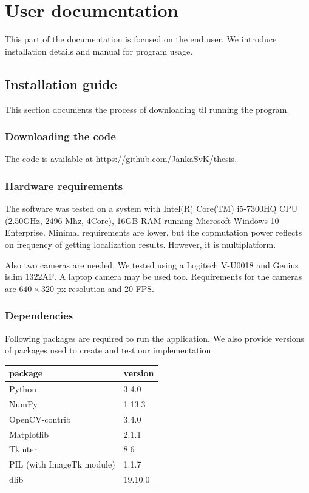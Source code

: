 \chapter{User documentation}
This part of the documentation is focused on the end user. We introduce
installation details and manual for program usage.

\section{Installation guide}
This section documents the process of downloading til running the program.

\subsection{Downloading the code}
The code is available at \url{https://github.com/JankaSvK/thesis}.

\subsection{Hardware requirements}
The software was tested on a system with Intel(R) Core(TM) i5-7300HQ CPU
(2.50GHz, 2496 Mhz, 4Core), 16GB RAM running Microsoft Windows 10 Enterprise.
Minimal requirements are lower, but the copmutation power reflects on frequency
of getting localization results. However, it is multiplatform.

Also two cameras are needed. We tested using a Logitech V-U0018 and Genius
islim 1322AF. A laptop camera may be used too. Requirements for the cameras
are $640\times320$ px resolution and 20 FPS.

\subsection{Dependencies}
Following packages are required to run the application. We also provide
versions of packages used to create and test our implementation.

\begin{center}
\begin{tabular}{l l}
	package	&	version 	\\ \hline
	Python	&	3.4.0 		\\
	NumPy	&	1.13.3 		\\
	OpenCV-contrib	&	3.4.0 	\\ 
	Matplotlib &	2.1.1 		\\
	Tkinter	&	8.6 		\\
	PIL (with ImageTk module)	&	1.1.7 		\\
	dlib	&	19.10.0
\end{tabular}
\end{center}


